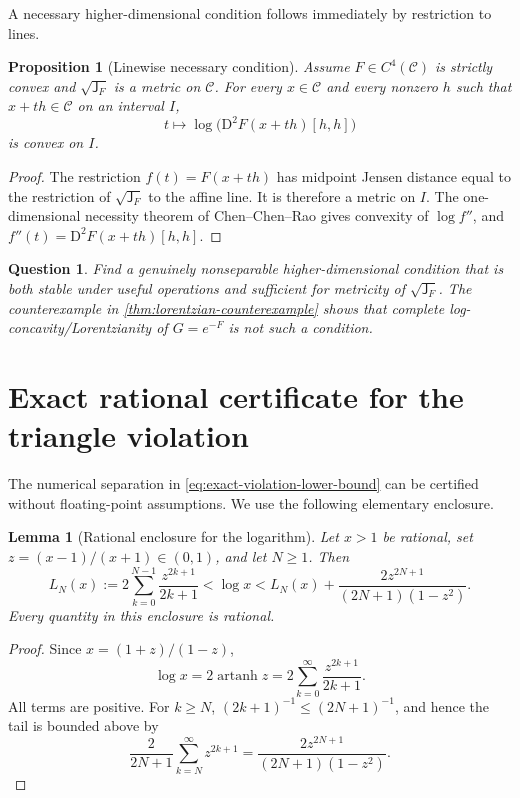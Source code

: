 \documentclass[11pt]{article}
\newtheorem{proposition}[theorem]{Proposition}
\newtheorem{lemma}[theorem]{Lemma}
\newtheorem{question}[theorem]{Question}
\theoremstyle{definition}
\newcommand{\C}{\mathcal{C}}
\newcommand{\J}{\mathsf{J}}
\newcommand{\D}{\mathrm{D}}
\begin{document}
A necessary higher-dimensional condition follows immediately by restriction to lines.

\begin{proposition}[Linewise necessary condition]\label{prop:linewise-necessary}
Assume $F\in C^4(\C)$ is strictly convex and $\sqrt{\J_F}$ is a metric on $\C$.
For every $x\in\C$ and every nonzero $h$ such that $x+th\in\C$ on an interval $I$,
\[
 t\longmapsto \log\bigl(\D^2F(x+th)[h,h]\bigr)
\]
is convex on $I$.
\end{proposition}

\begin{proof}
The restriction $f(t)=F(x+th)$ has midpoint Jensen distance equal to the restriction of
$\sqrt{\J_F}$ to the affine line.  It is therefore a metric on $I$.  The one-dimensional
necessity theorem of Chen--Chen--Rao \cite{ChenChenRao} gives convexity of $\log f''$, and
$f''(t)=\D^2F(x+th)[h,h]$.
\end{proof}

\begin{question}
Find a genuinely nonseparable higher-dimensional condition that is both stable under useful
operations and sufficient for metricity of $\sqrt{\J_F}$.  The counterexample in
\cref{thm:lorentzian-counterexample} shows that complete log-concavity/Lorentzianity of
$G=e^{-F}$ is not such a condition.
\end{question}

\appendix
\section{Exact rational certificate for the triangle violation}\label{app:certificate}

The numerical separation in \eqref{eq:exact-violation-lower-bound} can be certified without
floating-point assumptions.  We use the following elementary enclosure.

\begin{lemma}[Rational enclosure for the logarithm]\label{lem:log-enclosure}
Let $x>1$ be rational, set $z=(x-1)/(x+1)\in(0,1)$, and let $N\ge1$.  Then
\[
 L_N(x):=2\sum_{k=0}^{N-1}\frac{z^{2k+1}}{2k+1}
 <\log x
 <L_N(x)+\frac{2z^{2N+1}}{(2N+1)(1-z^2)}.
\]
Every quantity in this enclosure is rational.
\end{lemma}

\begin{proof}
Since $x=(1+z)/(1-z)$,
\[
 \log x=2\operatorname{artanh}z
 =2\sum_{k=0}^{\infty}\frac{z^{2k+1}}{2k+1}.
\]
All terms are positive.  For $k\ge N$, $(2k+1)^{-1}\le(2N+1)^{-1}$, and hence the tail is
bounded above by
\[
 \frac{2}{2N+1}\sum_{k=N}^{\infty}z^{2k+1}
 =\frac{2z^{2N+1}}{(2N+1)(1-z^2)}.
\]
\end{proof}
\end{document}
